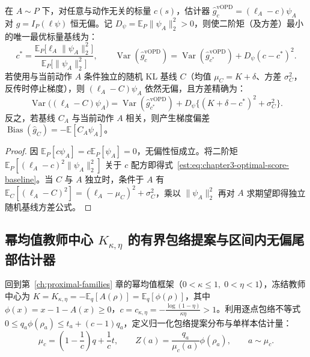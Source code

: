 \documentclass[lang=cn,scheme=chinese,openany]{elegantbook}
\newcommand{\E}{\mathbb E}
\newcommand{\Var}{\operatorname{Var}}
\begin{document}
\begin{proposition}
\label{est:prop:chapter3-vopd}
在 $A\sim P$ 下，对任意与动作无关的标量 $c(s)$，估计器 $\widehat g_c^{\mathrm{vOPD}}=(\ell_A-c)\psi_A$ 对 $g=I_P(\ell\psi)$ 恒无偏。记 $D_\psi=\E_P\|\psi_A\|_2^2>0$，则使二阶矩（及方差）最小的唯一最优标量基线为：
\begin{equation}
 c^*=\frac{\E_P\bigl[\ell_A\lVert \psi_A\rVert_2^2\bigr]}{\E_P\bigl[\lVert \psi_A\rVert_2^2\bigr]},\qquad
 \Var(\widehat g_c^{\mathrm{vOPD}})=\Var(\widehat g_{c^*}^{\mathrm{vOPD}})+D_\psi(c-c^*)^2.
 \label{est:eq:chapter3-optimal-score-baseline}
\end{equation}
若使用与当前动作 $A$ 条件独立的随机 KL 基线 $C$（均值 $\mu_C=K+\delta$、方差 $\sigma_C^2$，反传时停止梯度），则 $(\ell_A-C)\psi_A$ 依然无偏，且方差精确为：
\begin{equation*}
 \Var\bigl((\ell_A-C)\psi_A\bigr)
 =\Var(\widehat g_{c^*}^{\mathrm{vOPD}})
  +D_\psi\bigl\{(K+\delta-c^*)^2+\sigma_C^2\bigr\}.
\end{equation*}
反之，若基线 $C_A$ 与当前动作 $A$ 相关，则产生梯度偏差 $\operatorname{Bias}(\widehat g_C)=-\E[C_A\psi_A]$。
\label{est:eq:chapter3-random-baseline-bias}
\label{est:eq:chapter3-vopd}
\label{est:eq:chapter3-sample-grad-var}
\end{proposition}
\begin{proof}
因 $\E_P[c\psi_A]=c\E_P[\psi_A]=0$，无偏性恒成立。将二阶矩 $\E_P[(\ell_A-c)^2\|\psi_A\|_2^2]$ 关于 $c$ 配方即得式~\eqref{est:eq:chapter3-optimal-score-baseline}。当 $C$ 与 $A$ 独立时，条件于 $A$ 有 $\E_C[(\ell_A-C)^2]=(\ell_A-\mu_C)^2+\sigma_C^2$，乘以 $\|\psi_A\|_2^2$ 再对 $A$ 求期望即得独立随机基线方差公式。
\end{proof}

\subsection{幂均值教师中心 \texorpdfstring{$K_{\kappa,\eta}$}{K_{kappa,eta}} 的有界包络提案与区间内无偏尾部估计器}

回到第~\ref{ch:proximal-families} 章的幂均值框架（$0<\kappa\le 1,\;0<\eta<1$），冻结教师中心为 $K=K_{\kappa,\eta}=-\E_q[A(\rho)]=\E_q[\phi(\rho)]$，其中 $\phi(x)=x-1-A(x)\ge 0$，$c=c_{\kappa,\eta}=-\frac{\log(1-\eta)}{\kappa\eta}>1$。利用逐点包络不等式 $0\le q_a\phi(\rho_a)\le t_a+(c-1)q_a$，定义归一化包络提案分布与单样本估计量：
\begin{equation}
 \mu_c=\left(1-\frac1c\right)q+\frac1c t,\qquad
 Z(a)=\frac{q_a}{\mu_c(a)}\phi(\rho_a),\qquad a\sim\mu_c.
 \label{eq:center-bounded-mixture-estimator}
\end{equation}
\end{document}
